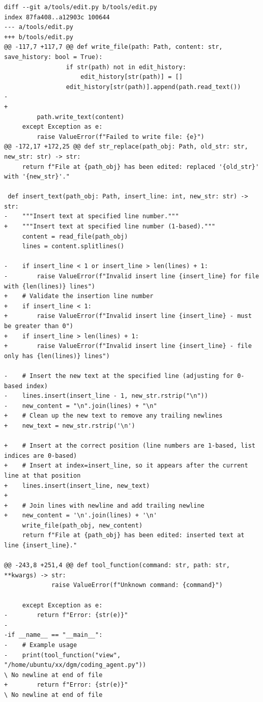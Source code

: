 \documentclass{article} %
\begin{document}
\begin{lstlisting}[style=diffstyle]
diff --git a/tools/edit.py b/tools/edit.py
index 87fa408..a12903c 100644
--- a/tools/edit.py
+++ b/tools/edit.py
@@ -117,7 +117,7 @@ def write_file(path: Path, content: str, save_history: bool = True):
                 if str(path) not in edit_history:
                     edit_history[str(path)] = []
                 edit_history[str(path)].append(path.read_text())
-
+        
         path.write_text(content)
     except Exception as e:
         raise ValueError(f"Failed to write file: {e}")
@@ -172,17 +172,25 @@ def str_replace(path_obj: Path, old_str: str, new_str: str) -> str:
     return f"File at {path_obj} has been edited: replaced '{old_str}' with '{new_str}'."
 
 def insert_text(path_obj: Path, insert_line: int, new_str: str) -> str:
-    """Insert text at specified line number."""
+    """Insert text at specified line number (1-based)."""
     content = read_file(path_obj)
     lines = content.splitlines()
 
-    if insert_line < 1 or insert_line > len(lines) + 1:
-        raise ValueError(f"Invalid insert line {insert_line} for file with {len(lines)} lines")
+    # Validate the insertion line number
+    if insert_line < 1:
+        raise ValueError(f"Invalid insert line {insert_line} - must be greater than 0")
+    if insert_line > len(lines) + 1:
+        raise ValueError(f"Invalid insert line {insert_line} - file only has {len(lines)} lines")
 
-    # Insert the new text at the specified line (adjusting for 0-based index)
-    lines.insert(insert_line - 1, new_str.rstrip("\n"))
-    new_content = "\n".join(lines) + "\n"
+    # Clean up the new text to remove any trailing newlines
+    new_text = new_str.rstrip('\n')
     
+    # Insert at the correct position (line numbers are 1-based, list indices are 0-based)
+    # Insert at index=insert_line, so it appears after the current line at that position
+    lines.insert(insert_line, new_text)
+
+    # Join lines with newline and add trailing newline
+    new_content = '\n'.join(lines) + '\n'
     write_file(path_obj, new_content)
     return f"File at {path_obj} has been edited: inserted text at line {insert_line}."
 
@@ -243,8 +251,4 @@ def tool_function(command: str, path: str, **kwargs) -> str:
             raise ValueError(f"Unknown command: {command}")
 
     except Exception as e:
-        return f"Error: {str(e)}"
-
-if __name__ == "__main__":
-    # Example usage
-    print(tool_function("view", "/home/ubuntu/xx/dgm/coding_agent.py"))
\ No newline at end of file
+        return f"Error: {str(e)}"
\ No newline at end of file
\end{lstlisting}
\end{document}
